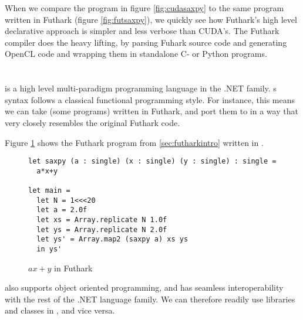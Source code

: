 When we compare the program in figure \ref{fig:cudasaxpy} to the same program
written in Futhark (figure \ref{fig:futsaxpy}), we quickly see how Futhark's
high level declarative approach is simpler and less verbose than CUDA's.
The Futhark compiler does the heavy lifting, by parsing Fuhark source code and
generating OpenCL code and wrapping them in standalone C- or Python programs.

\section{\fsharp{}}
\fsharp{} is a high level multi-paradigm programming language in the .NET family.
\fsharp{}s syntax follows a classical functional programming style. For
instance, this means we can take (some programs) written in Futhark, and port
them to \fsharp{} in a way that very closely resembles the original Futhark
code.

Figure \ref{fig:fsharpsaxpy} shows the Futhark program from
\ref{sec:futharkintro} written in \fsharp{}.

\begin{figure}[H]
  \centering
\begin{verbatim}
let saxpy (a : single) (x : single) (y : single) : single =
  a*x+y
  
let main =
  let N = 1<<<20
  let a = 2.0f
  let xs = Array.replicate N 1.0f
  let ys = Array.replicate N 2.0f
  let ys' = Array.map2 (saxpy a) xs ys
  in ys'
  \end{verbatim}
  \caption{$ax+y$ in Futhark}
  \label{fig:fsharpsaxpy}
\end{figure}

\fsharp{} also supports object oriented programming, and has seamless
interoperability with the rest of the .NET language family. We can therefore
readily use \csharp{} libraries and classes in \fsharp{}, and vice versa.

\section*{\csharp{}}
\csharp{} 
\csharp{} 
\csharp{} 
\csharp{} 

